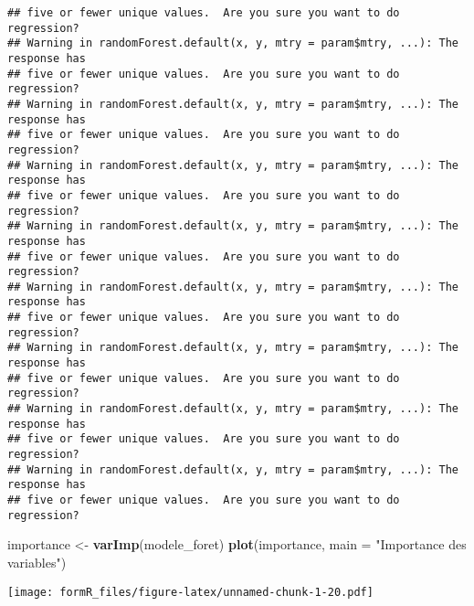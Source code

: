 \documentclass[
]{article}
\newenvironment{Shaded}{\begin{snugshade}}{\end{snugshade}}
\newcommand{\AttributeTok}[1]{\textcolor[rgb]{0.13,0.29,0.53}{#1}}
\newcommand{\FunctionTok}[1]{\textcolor[rgb]{0.13,0.29,0.53}{\textbf{#1}}}
\newcommand{\NormalTok}[1]{#1}
\newcommand{\OtherTok}[1]{\textcolor[rgb]{0.56,0.35,0.01}{#1}}
\newcommand{\StringTok}[1]{\textcolor[rgb]{0.31,0.60,0.02}{#1}}
\begin{document}
\begin{verbatim}
## five or fewer unique values.  Are you sure you want to do regression?
## Warning in randomForest.default(x, y, mtry = param$mtry, ...): The response has
## five or fewer unique values.  Are you sure you want to do regression?
## Warning in randomForest.default(x, y, mtry = param$mtry, ...): The response has
## five or fewer unique values.  Are you sure you want to do regression?
## Warning in randomForest.default(x, y, mtry = param$mtry, ...): The response has
## five or fewer unique values.  Are you sure you want to do regression?
## Warning in randomForest.default(x, y, mtry = param$mtry, ...): The response has
## five or fewer unique values.  Are you sure you want to do regression?
## Warning in randomForest.default(x, y, mtry = param$mtry, ...): The response has
## five or fewer unique values.  Are you sure you want to do regression?
## Warning in randomForest.default(x, y, mtry = param$mtry, ...): The response has
## five or fewer unique values.  Are you sure you want to do regression?
## Warning in randomForest.default(x, y, mtry = param$mtry, ...): The response has
## five or fewer unique values.  Are you sure you want to do regression?
## Warning in randomForest.default(x, y, mtry = param$mtry, ...): The response has
## five or fewer unique values.  Are you sure you want to do regression?
\end{verbatim}

\begin{Shaded}
\begin{Highlighting}[]
\NormalTok{importance }\OtherTok{\textless{}{-}} \FunctionTok{varImp}\NormalTok{(modele\_foret)}
\FunctionTok{plot}\NormalTok{(importance, }\AttributeTok{main =} \StringTok{"Importance des variables"}\NormalTok{)}
\end{Highlighting}
\end{Shaded}

\texttt{[image: formR\_files/figure-latex/unnamed-chunk-1-20.pdf]}
\end{document}
